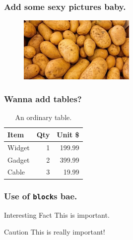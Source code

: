\documentclass{beamer}
\begin{document}
\begin{frame}
    \frametitle{Add some sexy pictures baby.}
    \begin{figure}
        \includegraphics[width=0.5\textwidth]{potato}
    \end{figure}
\end{frame}

\begin{frame}
    \frametitle{Wanna add tables?}
    \begin{table}
        \begin{tabular}{ |l|r|r| }
            \hline
            Item & Qty & Unit \$ \\
            \hline
            Widget & 1 & 199.99 \\
            Gadget & 2 & 399.99 \\
            Cable & 3 & 19.99 \\
            \hline
        \end{tabular}
        \caption{An ordinary table.}
    \end{table}
\end{frame}

\begin{frame}
    \frametitle{Use of \texttt{block}s bae.}
    \begin{block}{Interesting Fact}
    This is important.
    \end{block}
    \begin{alertblock}{Caution}
    This is really important!
    \end{alertblock}
\end{frame}
\end{document}
